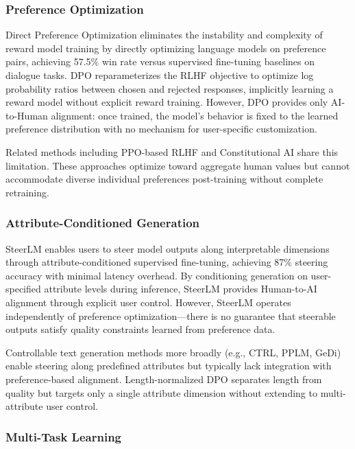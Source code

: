 
\subsubsection{Preference Optimization}

Direct Preference Optimization \citep{Rafailov2023DPO} eliminates the instability and complexity of reward model training by directly optimizing language models on preference pairs, achieving 57.5\% win rate versus supervised fine-tuning baselines on dialogue tasks. DPO reparameterizes the RLHF objective to optimize log probability ratios between chosen and rejected responses, implicitly learning a reward model without explicit reward training. However, DPO provides only AI-to-Human alignment: once trained, the model's behavior is fixed to the learned preference distribution with no mechanism for user-specific customization.

Related methods including PPO-based RLHF \citep{Ouyang2022InstructGPT} and Constitutional AI \citep{Bai2022Constitutional} share this limitation. These approaches optimize toward aggregate human values but cannot accommodate diverse individual preferences post-training without complete retraining.

\subsubsection{Attribute-Conditioned Generation}

SteerLM \citep{Dong2023SteerLM} enables users to steer model outputs along interpretable dimensions through attribute-conditioned supervised fine-tuning, achieving 87\% steering accuracy with minimal latency overhead. By conditioning generation on user-specified attribute levels during inference, SteerLM provides Human-to-AI alignment through explicit user control. However, SteerLM operates independently of preference optimization---there is no guarantee that steerable outputs satisfy quality constraints learned from preference data.

Controllable text generation methods more broadly (e.g., CTRL, PPLM, GeDi) enable steering along predefined attributes but typically lack integration with preference-based alignment. Length-normalized DPO \citep{Park2024LengthNormalized} separates length from quality but targets only a single attribute dimension without extending to multi-attribute user control.

\subsubsection{Multi-Task Learning}

